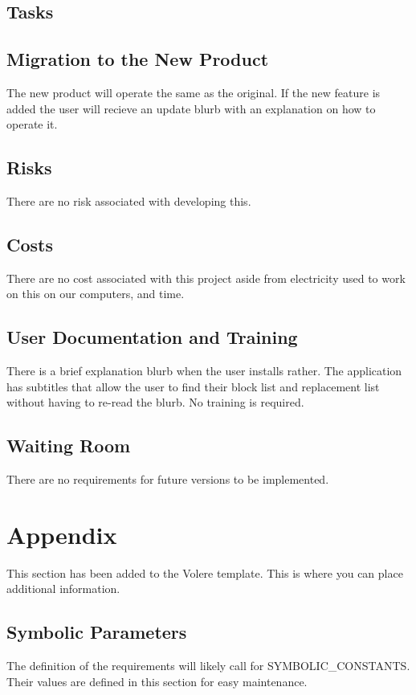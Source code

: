 \documentclass[12pt, titlepage]{article}
\begin{document}
\subsection{Tasks}

\subsection{Migration to the New Product}
The new product will operate the same as the original. If the new feature is added the user will recieve an update blurb with an explanation on how to operate it. 

\subsection{Risks}
There are no risk associated with developing this.

\subsection{Costs}
There are no cost associated with this project aside from electricity used to work on this on our computers, and time. 

\subsection{User Documentation and Training}
There is a brief explanation blurb when the user installs rather. The application has subtitles that allow the user to find their block list and replacement list without having to re-read the blurb. No training is required.

\subsection{Waiting Room}
There are no requirements for future versions to be implemented.

\section{Appendix}

This section has been added to the Volere template.  This is where you can place
additional information.

\subsection{Symbolic Parameters}

The definition of the requirements will likely call for SYMBOLIC\_CONSTANTS.
Their values are defined in this section for easy maintenance.
\end{document}
